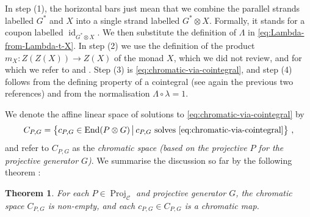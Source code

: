 \documentclass[11pt]{amsart}
\newtheorem{thm}{Theorem}[section]
\theoremstyle{definition}
\numberwithin{equation}{section}
\newcommand{\Proj}{\operatorname{Proj}}
\def\cC{\mathcal{C}}
\def\to{\rightarrow}
\def\End{{\operatorname{End}}}
\def\id{{\operatorname{id}}}
\begin{document}
In step (1), the horizontal bars just mean that we combine the parallel strands labelled $G^*$ and $X$ into a single strand labelled $G^* \otimes X$. Formally, it stands for a coupon labelled $\id_{G^* \otimes X}$. We then substitute the definition of $\Lambda$ in \eqref{eq:Lambda-from-Lambda-t-X}. In step (2) we use the definition of the product $m_X : Z(Z(X)) \to Z(X)$ of the monad $X$, which we did not review, and for which we refer to \cite{bruguières2006hopfmonads} and \cite[Sec.\,4.5]{CGPV23}. Step (3) is \eqref{eq:chromatic-via-cointegral}, and step (4) follows from the defining property of a cointegral (see again the previous two references) and from the normalisation $\Lambda \circ \lambda = 1$.

We denote the affine linear space of solutions to  \eqref{eq:chromatic-via-cointegral} by 
\begin{equation}\label{eq:CPG-def}
    C_{P,G} = \big\{ c_{P,G} \in \End(P \otimes G) \,\big|\, c_{P,G} \text{ solves \eqref{eq:chromatic-via-cointegral}} \big\} \ ,
\end{equation}
and refer to $C_{P,G}$ as the \textit{chromatic space (based on the projective $P$ for the projective generator $G$)}. 
We summarise the discussion so far by the following theorem \cite[Thm.\,4.2]{CGPV23}:

\begin{thm}
For each $P \in \Proj_{\cC}$ and projective generator $G$, the chromatic space $C_{P,G}$ is non-empty, and each $c_{P,G} \in C_{P,G}$ is a chromatic map.
\end{thm}
\end{document}
